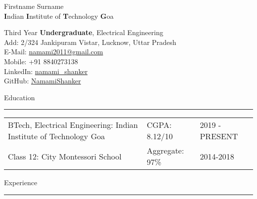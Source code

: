 \documentclass[10pt, hidelinks]{article}
\begin{document}

	\begin{minipage}[t]{0.46\textwidth}
		{\Huge\color{RoyalBlue}Firstname Surname}\\
		{\Large\textbf{I}ndian \textbf{I}nstitute of \textbf{T}echnology \textbf{G}oa}
	\end{minipage}
	\begin{minipage}[t]{0.54\textwidth}
		\begin{flushright}
			{\small
			Third Year \textbf{Undergraduate}, {\color{RoyalBlue}Electrical Engineering\\}
			{\color{RoyalBlue}Add: }{2/324 Jankipuram Vistar, Lucknow, Uttar Pradesh\\}
			{\color{RoyalBlue}E-Mail: }{\href{mailto:namami2011@gmail.com}{namami2011@gmail.com}\\}
			{\color{RoyalBlue}Mobile: }{+91 8840273138\\}
			{\color{RoyalBlue}LinkedIn: }{\href{https://www.linkedin.com/in/namamishanker/}{namami\_shanker}\\}
			{\color{RoyalBlue}GitHub: }{\href{https://www.linkedin.com/in/namamishanker/}{NamamiShanker}\\}
			}
		\end{flushright}
	\end{minipage}


	{\large\color{RoyalBlue}Education}
	\par\noindent\rule[7pt]{\textwidth}{0.1pt}
	\begin{center}
		{\small \vspace*{-5mm}
		\begin{tabular}{ m{} m{} m{}}
			BTech, Electrical Engineering: Indian Institute of Technology Goa & CGPA: 8.12/10 & 2019 - PRESENT \\
			Class 12: City Montessori School & Aggregate: 97\% & 2014-2018 \\
		\end{tabular}
		}
	\end{center}


	{\large\color{RoyalBlue}Experience}
	\par\noindent\rule[7pt]{\textwidth}{0.1pt}
\end{document}
